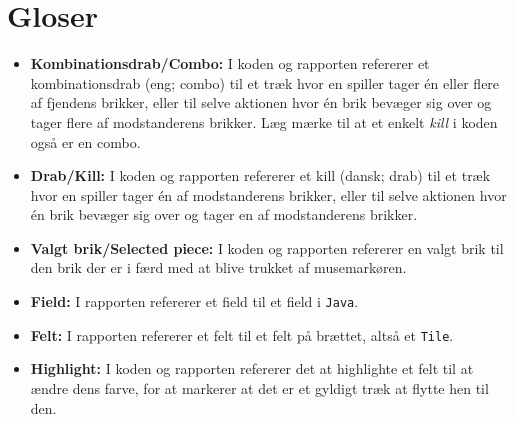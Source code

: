 

\section{Gloser}
\label{Gloser}
\begin{itemize}
\item \textbf{Kombinationsdrab/Combo:} I koden og rapporten refererer et kombinationsdrab (eng; combo) til et træk hvor en spiller tager én eller flere af fjendens brikker, eller til selve aktionen hvor én brik bevæger sig over og tager flere af modstanderens brikker. Læg mærke til at et enkelt \textit{kill} i koden også er en combo.
    
\item \textbf{Drab/Kill:} I koden og rapporten refererer et kill (dansk; drab) til et træk hvor en spiller tager én af modstanderens brikker, eller til selve aktionen hvor én brik bevæger sig over og tager en af modstanderens brikker. 
    
\item \textbf{Valgt brik/Selected piece:} I koden og rapporten refererer en valgt brik til den brik der er i færd med at blive trukket af musemarkøren. 

\item \textbf{Field:} I rapporten refererer et field til et field i \texttt{Java}.

\item \textbf{Felt:} I rapporten refererer et felt til et felt på brættet, altså et \texttt{Tile}.

\item \textbf{Highlight:} I koden og rapporten refererer det at highlighte et felt til at ændre dens farve, for at markerer at det er et gyldigt træk at flytte hen til den.

\end{itemize}




